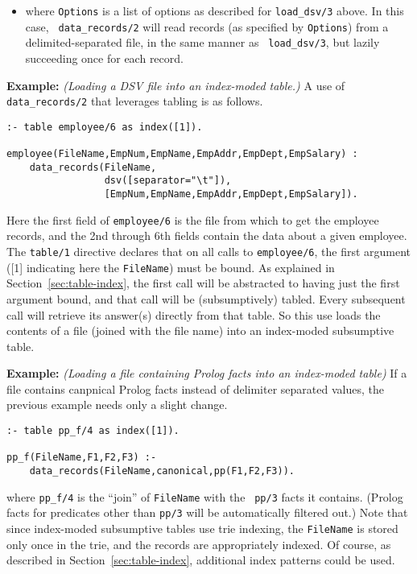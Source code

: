 \begin{description}
\begin{itemize}
\item[{\tt dsv(Options)}] where {\tt Options} is a list of options as
  described for {\tt load\_dsv/3} above.  In this case, {\tt
    data\_records/2} will read records (as specified by {\tt Options})
  from a delimited-separated file, in the same manner as {\tt
    load\_dsv/3}, but lazily succeeding once for each record.

\end{itemize}
  
{\bf Example:} {\em (Loading a DSV file into an index-moded table.)}
A use of {\tt data\_records/2} that leverages tabling is as follows.
\begin{verbatim}
:- table employee/6 as index([1]).

employee(FileName,EmpNum,EmpName,EmpAddr,EmpDept,EmpSalary) :
    data_records(FileName,
                 dsv([separator="\t"]),
                 [EmpNum,EmpName,EmpAddr,EmpDept,EmpSalary]).
\end{verbatim}
Here the first field of {\tt employee/6} is the file from which to get
the employee records, and the 2nd through 6th fields contain the data
about a given employee.  The {\tt table/1} directive declares that on
all calls to {\tt employee/6}, the first argument ([1] indicating here
the {\tt FileName}) must be bound.  As explained in
Section~\ref{sec:table-index}, the first call will be abstracted to
having just the first argument bound, and that call will be
(subsumptively) tabled.  Every subsequent call will retrieve its
answer(s) directly from that table.  So this use loads the contents of
a file (joined with the file name) into an index-moded subsumptive
table.

{\bf Example:} {\em (Loading a file containing Prolog facts into an
  index-moded table)} If a file contains canpnical Prolog
facts instead of delimiter separated values, the previous example
needs only a slight change.
\begin{verbatim}
:- table pp_f/4 as index([1]).

pp_f(FileName,F1,F2,F3) :-
    data_records(FileName,canonical,pp(F1,F2,F3)).
\end{verbatim}

where {\tt pp\_f/4} is the ``join'' of {\tt FileName} with the {\tt
  pp/3} facts it contains.  (Prolog facts for predicates other than
{\tt pp/3} will be automatically filtered out.)  Note that since
index-moded subsumptive tables use trie indexing, the {\tt FileName}
is stored only once in the trie, and the records are appropriately
indexed.  Of course, as described in Section~\ref{sec:table-index},
additional index patterns could be used.


\end{description}
